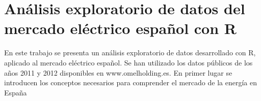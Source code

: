 \chapter{Análisis exploratorio de datos del mercado eléctrico español con R}




En este trabajo se presenta un análisis exploratorio de datos desarrollado con R,  aplicado al mercado eléctrico español. Se han utilizado los datos públicos de los años 2011 y 2012 disponibles en www.omelholding.es. En primer lugar se introducen los conceptos necesarios para comprender el mercado de la energía en España

%

%

